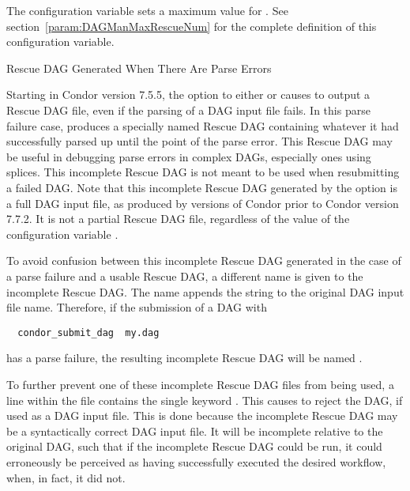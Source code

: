 The configuration variable 
sets a maximum value for \verb@XXX@.
See section~\ref{param:DAGManMaxRescueNum} for the complete definition
of this configuration variable.


\label{dagman:rescue_parse_error}
\begin{description}
\item[Rescue DAG Generated When There Are Parse Errors]
\end{description}

Starting in Condor version 7.5.5,
the  option to either  or 
causes  to output a Rescue DAG file, 
even if the parsing of a DAG input file fails.
In this parse failure case,  produces a specially 
named Rescue DAG containing whatever it had successfully parsed up
until the point of the parse error.
This Rescue DAG may be useful in debugging parse errors in complex DAGs,
especially ones using splices.
This incomplete Rescue DAG is not meant to be used when resubmitting
a failed DAG.  
Note that this incomplete Rescue DAG generated by the 
option is a full DAG input file, 
as produced by versions of Condor prior to Condor version 7.7.2.
It is not a partial Rescue DAG file,
regardless of the value of the configuration variable
.

To avoid confusion between this incomplete Rescue DAG
generated in the case of a parse failure and a usable Rescue DAG,
a different name is given to the incomplete Rescue DAG.
The name appends the string  to the original
DAG input file name.
Therefore, if the submission of a DAG with
\begin{verbatim}
  condor_submit_dag  my.dag
\end{verbatim}
has a parse failure, the resulting incomplete Rescue DAG will be
named .

To further prevent one of these incomplete Rescue DAG files from being used,
a line within the file contains the single keyword .
This causes  to reject the DAG, if used as a DAG input file.
This is done because the
incomplete Rescue DAG may be a syntactically correct DAG input file.
It will be incomplete relative to the original DAG,
such that if the incomplete Rescue DAG could be run,
it could erroneously be perceived as
having successfully executed the desired workflow, when, in fact,
it did not.

